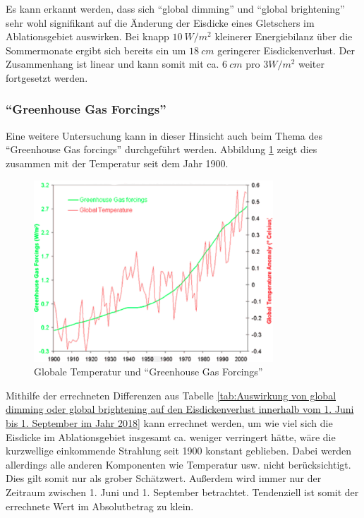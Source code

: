 \documentclass[12pt,a4paper]{article}
\begin{document}
Es kann erkannt werden, dass sich ``global dimming'' und ``global brightening'' sehr wohl signifikant auf die Änderung der Eisdicke eines Gletschers im Ablationsgebiet auswirken. Bei knapp $10~W/m^2$ kleinerer Energiebilanz über  die Sommermonate ergibt sich bereits ein um $18~cm$ geringerer Eisdickenverlust. Der Zusammenhang ist linear und kann somit mit ca. $6~cm$ pro $3 W/m^2$ weiter fortgesetzt werden.\\

\subsubsection{``Greenhouse Gas Forcings''}
Eine weitere Untersuchung kann in dieser Hinsicht auch beim Thema des ``Greenhouse Gas forcings'' durchgeführt werden. Abbildung \ref{Globale Temperatur und ``Greenhouse Gas Forcings''} zeigt dies zusammen mit der Temperatur seit dem Jahr 1900. 

\begin{figure}[H]
\centering
\includegraphics[width=0.8\textwidth]{pictures/greenhouse_gas_forcing.png}
\caption[Globale Temperatur und ``Greenhouse Gas Forcings'']{Globale Temperatur und ``Greenhouse Gas Forcings'' \parencite{GreenhouseGasForcing}}
\label{Globale Temperatur und ``Greenhouse Gas Forcings''}
\end{figure}


Mithilfe der errechneten Differenzen aus Tabelle \ref{tab:Auswirkung von global dimming oder global brightening auf den Eisdickenverlust innerhalb vom 1. Juni bis 1. September im Jahr 2018} kann errechnet werden, um wie viel sich die Eisdicke im Ablationsgebiet insgesamt ca. weniger verringert hätte, wäre die kurzwellige einkommende Strahlung seit 1900 konstant geblieben. Dabei werden allerdings alle anderen Komponenten wie Temperatur usw. nicht berücksichtigt. Dies gilt somit nur als grober Schätzwert. Außerdem wird immer nur der Zeitraum zwischen 1. Juni und 1. September betrachtet. Tendenziell ist somit der errechnete Wert im Absolutbetrag zu klein.\\
\end{document}
